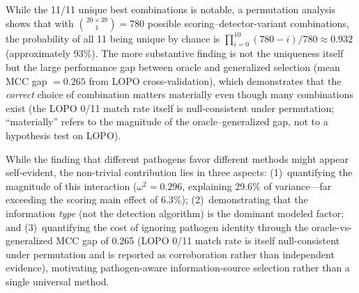 While the 11/11 unique best combinations is notable, a permutation analysis shows that with $\binom{20 \times 39}{1} = 780$ possible scoring--detector-variant combinations, the probability of all 11 being unique by chance is $\prod_{i=0}^{10}(780-i)/780 \approx 0.932$ (approximately 93\%).
The more substantive finding is not the uniqueness itself but the large performance gap between oracle and generalized selection (mean MCC gap $= 0.265$ from LOPO cross-validation), which demonstrates that the \emph{correct} choice of combination matters materially even though many combinations exist (the LOPO 0/11 match rate itself is null-consistent under permutation; ``materially'' refers to the magnitude of the oracle--generalized gap, not to a hypothesis test on LOPO).

While the finding that different pathogens favor different methods might appear self-evident, the non-trivial contribution lies in three aspects: (1)~quantifying the magnitude of this interaction ($\omega^2 = 0.296$, explaining 29.6\% of variance---far exceeding the scoring main effect of 6.3\%); (2)~demonstrating that the information \textit{type} (not the detection algorithm) is the dominant modeled factor; and (3)~quantifying the cost of ignoring pathogen identity through the oracle-vs-generalized MCC gap of 0.265 (LOPO 0/11 match rate is itself null-consistent under permutation and is reported as corroboration rather than independent evidence), motivating pathogen-aware information-source selection rather than a single universal method.

